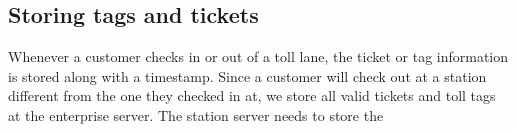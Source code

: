 \subsection{Storing tags and tickets}
Whenever a customer checks in or out of a toll lane, the ticket or tag information is stored along with a timestamp. Since a customer will check out at a station different from the one they checked in at, we store all valid tickets and toll tags at the enterprise server. The station server needs to store the 